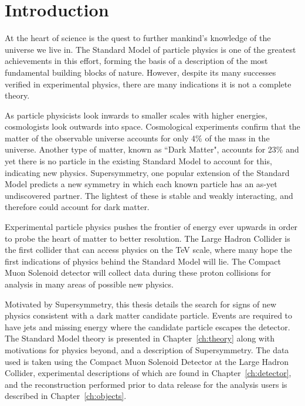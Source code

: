 \setcounter{equation}{0}
\setcounter{figure}{0}
\setcounter{table}{0}

\chapter{\label{chapter1} Introduction}

At the heart of science is the quest to further mankind's knowledge of the universe we live in. The Standard Model of particle physics is one of the greatest achievements in this effort, forming the basis of a description of the most fundamental building blocks of nature. However, despite its many successes verified in experimental physics, there are many indications it is not a complete theory. 

As particle physicists look inwards to smaller scales with higher energies, cosmologists look outwards into space. Cosmological experiments confirm that the matter of the observable universe accounts for only 4\% of the mass in the universe. Another type of matter, known as ``Dark Matter", accounts for 23\% and yet there is no particle in the existing Standard Model to account for this, indicating new physics.  Supersymmetry, one popular extension of the Standard Model predicts a new symmetry in which each known particle has an as-yet undiscovered partner. The lightest of these is stable and weakly interacting, and therefore could account for dark matter. 

Experimental particle physics pushes the frontier of energy ever upwards in order to probe the heart of matter to better resolution. The Large Hadron Collider is the first collider that can access physics on the TeV scale, where many hope the first indications of physics behind the Standard Model will lie. The Compact Muon Solenoid detector will collect data during these proton collisions for analysis in many areas of possible new physics. 

Motivated by Supersymmetry, this thesis details the search for signs of new physics consistent with a dark matter candidate particle. Events are required to have jets and missing energy where the candidate particle escapes the detector. The Standard Model theory is presented in Chapter~\ref{ch:theory} along with motivations for physics beyond, and a description of Supersymmetry. The data used is taken using the Compact Muon Solenoid Detector at the Large Hadron Collider, experimental descriptions of which are found in Chapter~\ref{ch:detector}, and the reconstruction performed prior to data release for the analysis users is described in Chapter~\ref{ch:objects}.


